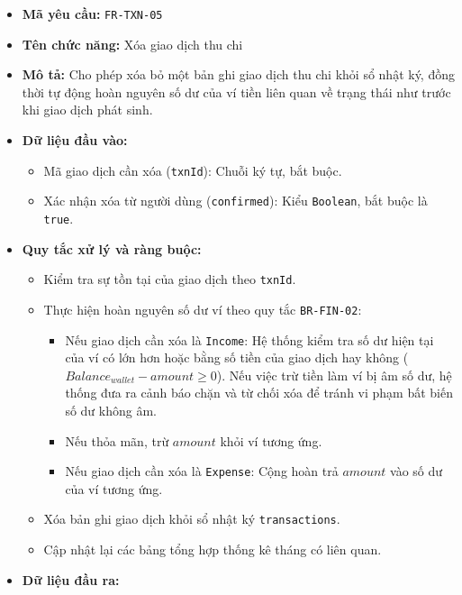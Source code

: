 \documentclass[11pt,a4paper]{article}
\providecommand{\tightlist}{
  \setlength{\itemsep}{0pt}\setlength{\parskip}{0pt}}
\begin{document}
\begin{itemize}
\tightlist
\item
  \textbf{Mã yêu cầu:} \texttt{FR-TXN-05}
\item
  \textbf{Tên chức năng:} Xóa giao dịch thu chi
\item
  \textbf{Mô tả:} Cho phép xóa bỏ một bản ghi giao dịch thu chi khỏi sổ
  nhật ký, đồng thời tự động hoàn nguyên số dư của ví tiền liên quan về
  trạng thái như trước khi giao dịch phát sinh.
\item
  \textbf{Dữ liệu đầu vào:}

  \begin{itemize}
  \tightlist
  \item
    Mã giao dịch cần xóa (\texttt{txnId}): Chuỗi ký tự, bắt buộc.
  \item
    Xác nhận xóa từ người dùng (\texttt{confirmed}): Kiểu
    \texttt{Boolean}, bắt buộc là \texttt{true}.
  \end{itemize}
\item
  \textbf{Quy tắc xử lý và ràng buộc:}

  \begin{itemize}
  \tightlist
  \item
    Kiểm tra sự tồn tại của giao dịch theo \texttt{txnId}.
  \item
    Thực hiện hoàn nguyên số dư ví theo quy tắc \texttt{BR-FIN-02}:

    \begin{itemize}
    \tightlist
    \item
      Nếu giao dịch cần xóa là \texttt{Income}: Hệ thống kiểm tra số dư
      hiện tại của ví có lớn hơn hoặc bằng số tiền của giao dịch hay
      không (\(Balance_{wallet} - amount \ge 0\)). Nếu việc trừ tiền làm
      ví bị âm số dư, hệ thống đưa ra cảnh báo chặn và từ chối xóa để
      tránh vi phạm bất biến số dư không âm.
    \item
      Nếu thỏa mãn, trừ \(amount\) khỏi ví tương ứng.
    \item
      Nếu giao dịch cần xóa là \texttt{Expense}: Cộng hoàn trả
      \(amount\) vào số dư của ví tương ứng.
    \end{itemize}
  \item
    Xóa bản ghi giao dịch khỏi sổ nhật ký \texttt{transactions}.
  \item
    Cập nhật lại các bảng tổng hợp thống kê tháng có liên quan.
  \end{itemize}
\item
  \textbf{Dữ liệu đầu ra:}


\end{itemize}
\end{document}
